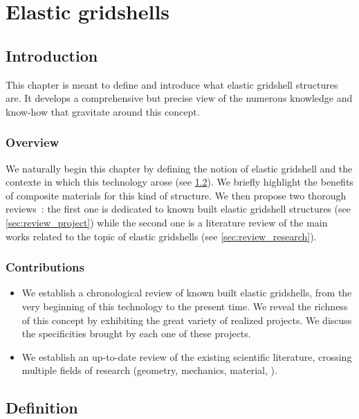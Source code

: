 
\chapter{Elastic gridshells}\label{chp:gridshell}

\section{Introduction}

This chapter is meant to define and introduce what elastic gridshell structures are. It develops a comprehensive but precise view of the numerous knowledge and know-how that gravitate around this concept.

\subsection{Overview}
We naturally begin this chapter by defining the notion of elastic gridshell and the contexte in which this technology arose (see \cref{sec:gsdef}). We briefly highlight the benefits of composite materials for this kind of structure. We then propose two thorough reviews~: the first one is dedicated to known built elastic gridshell structures (see \cref{sec:review_project}) while the second one is a literature review of the main works related  to the topic of elastic gridshells (see \cref{sec:review_research}).
 
\subsection{Contributions}
\begin{itemize}
\item We establish a chronological review of known built elastic gridshells, from the very beginning of this technology to the present time. We reveal the richness of this concept by exhibiting the great variety of realized projects. We discuss the specificities brought by each one of these projects.
\item We establish an up-to-date review of the existing scientific literature, crossing multiple fields of research (geometry, mechanics, material, \telp{}).
\end{itemize}

\section{Definition}\label{sec:gsdef}

